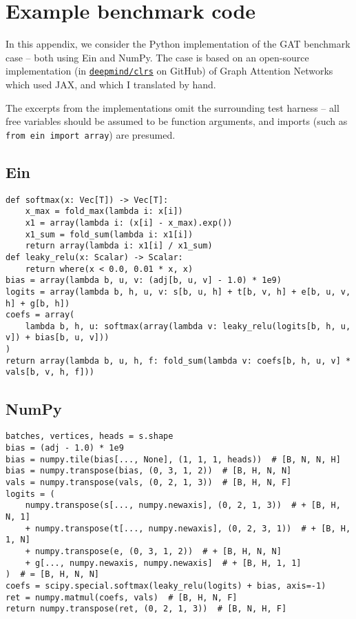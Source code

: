 \chapter{Example benchmark code}

In this appendix, we consider the Python implementation of the GAT benchmark case -- both using Ein and NumPy. The case is based on an open-source implementation (in \href{https://github.com/google-deepmind/clrs/blob/8697f51663bd77548f4b3108816c84d163883361/clrs/_src/processors.py#L99}{\texttt{deepmind/clrs}} on GitHub) of Graph Attention Networks which used JAX, and which I translated by hand.

The excerpts from the implementations omit the surrounding test harness -- all free variables should be assumed to be function arguments, and imports (such as \texttt{from ein import array}) are presumed.

\section*{Ein}

\begin{verbatim}
def softmax(x: Vec[T]) -> Vec[T]:
    x_max = fold_max(lambda i: x[i])
    x1 = array(lambda i: (x[i] - x_max).exp())
    x1_sum = fold_sum(lambda i: x1[i])
    return array(lambda i: x1[i] / x1_sum)
def leaky_relu(x: Scalar) -> Scalar:
    return where(x < 0.0, 0.01 * x, x)
bias = array(lambda b, u, v: (adj[b, u, v] - 1.0) * 1e9)
logits = array(lambda b, h, u, v: s[b, u, h] + t[b, v, h] + e[b, u, v, h] + g[b, h])
coefs = array(
    lambda b, h, u: softmax(array(lambda v: leaky_relu(logits[b, h, u, v]) + bias[b, u, v]))
)
return array(lambda b, u, h, f: fold_sum(lambda v: coefs[b, h, u, v] * vals[b, v, h, f]))
\end{verbatim}

\section*{NumPy}

\begin{verbatim}
batches, vertices, heads = s.shape
bias = (adj - 1.0) * 1e9
bias = numpy.tile(bias[..., None], (1, 1, 1, heads))  # [B, N, N, H]
bias = numpy.transpose(bias, (0, 3, 1, 2))  # [B, H, N, N]
vals = numpy.transpose(vals, (0, 2, 1, 3))  # [B, H, N, F]
logits = (
    numpy.transpose(s[..., numpy.newaxis], (0, 2, 1, 3))  # + [B, H, N, 1]
    + numpy.transpose(t[..., numpy.newaxis], (0, 2, 3, 1))  # + [B, H, 1, N]
    + numpy.transpose(e, (0, 3, 1, 2))  # + [B, H, N, N]
    + g[..., numpy.newaxis, numpy.newaxis]  # + [B, H, 1, 1]
)  # = [B, H, N, N]
coefs = scipy.special.softmax(leaky_relu(logits) + bias, axis=-1)
ret = numpy.matmul(coefs, vals)  # [B, H, N, F]
return numpy.transpose(ret, (0, 2, 1, 3))  # [B, N, H, F]
\end{verbatim}

